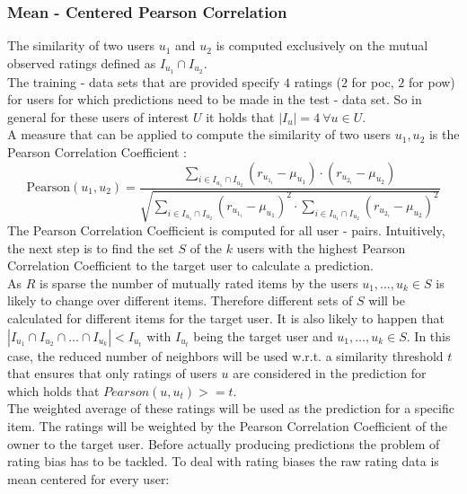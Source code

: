 \subsubsection{Mean - Centered Pearson Correlation}
The similarity of two users $u_1$ and $u_2$ is computed exclusively on the mutual observed ratings defined as $I_u_1 \cap I_u_2$.\\
The training - data sets that are provided specify $4$ ratings ($2$ for \acrshort{poc}, $2$ for \acrshort{pow}) for users for which predictions need to be made in the test - data set. So in general for these users of interest $U$ it holds that $|I_u| = 4\: \forall{u \in U}$.\\
A measure that can be applied to compute the similarity of two users $u_1, u_2$ is the Pearson Correlation Coefficient \cite{benesty2009pearson}:
\begin{equation}
    \text{Pearson}(u_1, u_2) = \frac{\sum\limits_{i \in I_u_1 \cap I_u_2} (r_{u_1_i} - \mu_u_1) \cdot (r_{u_2_i} - \mu_u_2)}{\sqrt{\sum\limits_{i \in I_u_1 \cap I_u_2} (r_{u_1_i} - \mu_u_1)^2 \cdot \sum\limits_{i \in I_u_1 \cap I_u_2} (r_{u_2_i} - \mu_u_2)^2}}
\end{equation}
The Pearson Correlation Coefficient is computed for all user - pairs. Intuitively, the next step is to find the set $S$ of the $k$ users with the highest Pearson Correlation Coefficient to the target user to calculate a prediction.\\
As $R$ is sparse the number of mutually rated items by the users $u_1,\dots,u_k \in S$ is likely to change over different items. Therefore different sets of $S$ will be calculated for different items for the target user. It is also likely to happen that $|I_{u_1} \cap I_{u_2} \cap \dots \cap I_{u_k}| < I_{u_t}$ with $I_{u_t}$ being the target user and $u_1,\dots,u_k \in S$. In this case, the reduced number of neighbors will be used w.r.t. a similarity threshold $t$ that ensures that only ratings of users $u$ are considered in the prediction for which holds that $Pearson(u, u_t) >= t$.\\
The weighted average of these ratings will be used as the prediction for a specific item. The ratings will be weighted by the Pearson Correlation Coefficient of the owner to the target user.
Before actually producing predictions the problem of rating bias has to be tackled. To deal with rating biases the raw rating data is mean centered for every user:

